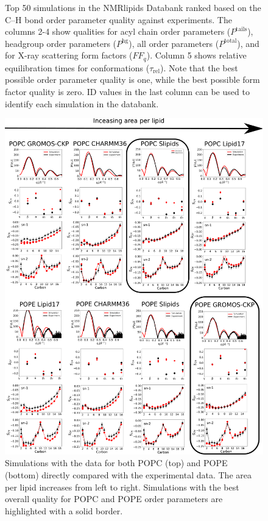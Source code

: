 \documentclass[fleqn,10pt]{wlscirepSI}
\begin{document}
\begin{figure}[!h]
    \caption{Top 50 simulations in the NMRlipids Databank ranked based on the C--H bond order parameter quality against experiments. The columns 2-4 show qualities for acyl chain order parameters ($P^\mathrm{tails}$), headgroup order parameters ($P^\mathrm{hg}$), all order parameters ($P^\mathrm{total}$), and for X-ray scattering form factors ($FF_q$). Column 5 shows relative equilibration times for conformations ($\tau_\mathrm{rel}$). Note that the best possible order parameter quality is one, while the best possible form factor quality is zero. ID values in the last column can be used to identify each simulation in the databank.}
    \label{fig:top50simulations}
\end{figure}


\begin{figure}[!h]
    \centering
    \includegraphics[height = 0.9\textheight]{Figures/POPC_POPE_dataSI.pdf}
    \caption{Simulations with the data for both POPC (top) and POPE (bottom) directly compared with the experimental data. The area per lipid increases from left to right. Simulations with the best overall quality for POPC and POPE order parameters are highlighted with a solid border.
  }
    \label{fig:POPC_POPE_dataSI}
\end{figure}
\end{document}

